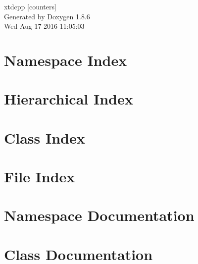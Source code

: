 \documentclass[twoside]{book}
\newcommand{\clearemptydoublepage}{%
  \newpage{\pagestyle{empty}\cleardoublepage}%
}
\begin{document}
\hypersetup{pageanchor=false}
\begin{titlepage}
\vspace*{7cm}
\begin{center}%
{\Large xtdcpp \mbox{[}counters\mbox{]} }\\
\vspace*{1cm}
{\large Generated by Doxygen 1.8.6}\\
\vspace*{0.5cm}
{\small Wed Aug 17 2016 11:05:03}\\
\end{center}
\end{titlepage}
\clearemptydoublepage
\tableofcontents
\clearemptydoublepage
{}
\hypersetup{pageanchor=true}

\chapter{Namespace Index}

\chapter{Hierarchical Index}

\chapter{Class Index}

\chapter{File Index}

\chapter{Namespace Documentation}


\chapter{Class Documentation}

















\end{document}
